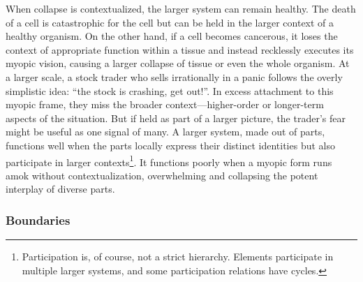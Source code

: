 \documentclass[11pt]{article}
\begin{document}
When collapse is contextualized, the larger system can remain healthy. The death of a cell is catastrophic for the cell but can be held in the larger context of a healthy organism. On the other hand, if a cell becomes cancerous, it loses the context of appropriate function within a tissue and instead recklessly executes its myopic vision, causing a larger collapse of tissue or even the whole organism. At a larger scale, a stock trader who sells irrationally in a panic follows the overly simplistic idea: ``the stock is crashing, get out!''. In excess attachment to this myopic frame, they miss the broader context---higher-order or longer-term aspects of the situation. But if held as part of a larger picture, the trader's fear might be useful as one signal of many. A larger system, made out of parts, functions well when the parts locally express their distinct identities but also participate in larger contexts\footnote{Participation is, of course, not a strict hierarchy. Elements participate in multiple larger systems, and some participation relations have cycles.}. It functions poorly when a myopic form runs amok without contextualization, overwhelming and collapsing the potent interplay of diverse parts. 









\subsubsection*{Boundaries}
\end{document}
